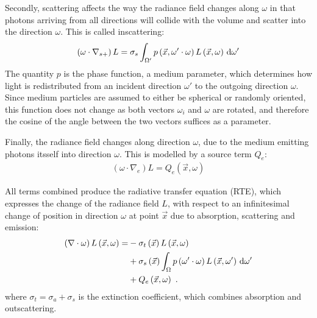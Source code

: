 Secondly, scattering affects the way the radiance field changes along $\omega$ in that photons arriving from all directions will collide with the volume and scatter into the direction $\omega$. This is called inscattering:
\begin{align}
\left(\omega\cdot\nabla_{s+}\right)L = \sigma_s \int_{\Omega'}p\left(\vec{x}, \omega'\cdot\omega\right)L\left(\vec{x}, \omega \right)\,\mathrm{d}\omega'
\label{eq:rte_inscattering}
\end{align}
The quantity $p$ is the phase function, a medium parameter, which determines how light is redistributed from an incident direction $\omega'$ to the outgoing direction $\omega$. Since medium particles are assumed to either be spherical or randomly oriented, this function does not change as both vectors $\omega_i$ and $\omega$ are rotated, and therefore the cosine of the angle between the two vectors suffices as a parameter.


Finally, the radiance field changes along direction $\omega$, due to the medium emitting photons itsself into direction $\omega$. This is modelled by a source term $Q_e$:
\begin{align}
\left(\omega\cdot\nabla_{e}\right)L = Q_e\left(\vec{x}, \omega\right)
\end{align}

All terms combined produce the radiative transfer equation (RTE), which expresses the change of the radiance field $L$, with respect to an infinitesimal change of position in direction $\omega$ at point $\vec{x}$ due to absorption, scattering and emission:
\begin{align}
\left(\nabla\cdot\omega\right)L\left(\vec{x}, \omega \right)
=&
-\sigma_t\left(\vec{x}\right) L\left(\vec{x}, \omega \right)\nonumber\\
&
+\sigma_s\left(\vec{x}\right) \int_{\Omega}
{
p\left(\omega'\cdot\omega\right)L\left(\vec{x}, \omega' \right)\,\mathrm{d}\omega'
}
\label{eq:rte}
\\
&
+Q_e\left(\vec{x}, \omega\right)
\nonumber
\  .
\end{align}
where $\sigma_t=\sigma_a+\sigma_s$ is the extinction coefficient, which combines absorption and outscattering.

